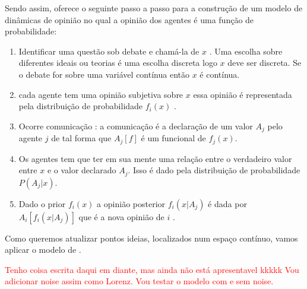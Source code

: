 Sendo assim,  oferece o seguinte passo a passo
para a construção de um modelo de dinâmicas de opinião no qual a opinião dos
agentes é uma função de probabilidade:

\begin{enumerate}
\item Identificar uma questão sob debate e chamá-la de $x$ . Uma
  escolha sobre diferentes ideais ou teorias é uma escolha discreta
  logo $x$ deve ser discreta. Se o debate for sobre uma variável
  contínua então $x$ é contínua.
\item cada agente tem uma opinião subjetiva sobre $x$ essa opinião é
  representada pela distribuição de probabilidade $f_i(x)$ .
\item Ocorre comunicação : a comunicação é a declaração de um valor
  $ A_j$ pelo agente $j$ de tal forma que $A_j[f]$ é um funcional de
  $f_j(x)$.
\item Os agentes tem que ter em sua mente  uma relação entre o
  verdadeiro valor entre $x$ e o valor declarado $A_j$. Isso é dado
  pela distribuição de probabilidade $P(A_j|x)$.
\item Dado o prior $f_i(x)$ a opinião posterior $f_i(x|A_j)$ é dada
  por $A_i[f_i(x|A_j)]$ que é a nova opinião de $i$ .
\end{enumerate}

Como queremos atualizar pontos ideias, localizados num espaço contínuo, vamos
aplicar o modelo de .

  \textcolor{red}{Tenho coisa escrita daqui em diante, mas ainda não está
    apresentavel kkkkk }
  \textcolor{red}{Vou adicionar noise assim como Lorenz. Vou testar o modelo com
  e sem noise.}
